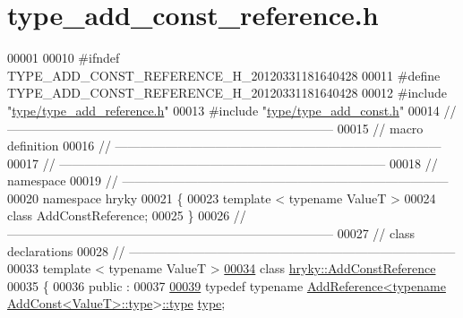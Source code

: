 \hypertarget{type__add__const__reference_8h_source}{\section{type\-\_\-add\-\_\-const\-\_\-reference.\-h}
}

\begin{DoxyCode}
00001 
00010 \textcolor{preprocessor}{#ifndef TYPE\_ADD\_CONST\_REFERENCE\_H\_20120331181640428}
00011 \textcolor{preprocessor}{}\textcolor{preprocessor}{#define TYPE\_ADD\_CONST\_REFERENCE\_H\_20120331181640428}
00012 \textcolor{preprocessor}{}\textcolor{preprocessor}{#include "\hyperlink{type__add__reference_8h}{type/type_add_reference.h}"}
00013 \textcolor{preprocessor}{#include "\hyperlink{type__add__const_8h}{type/type_add_const.h}"}
00014 \textcolor{comment}{//
      ------------------------------------------------------------------------------}
00015 \textcolor{comment}{// macro definition}
00016 \textcolor{comment}{//
      ------------------------------------------------------------------------------}
00017 \textcolor{comment}{//
      ------------------------------------------------------------------------------}
00018 \textcolor{comment}{// namespace}
00019 \textcolor{comment}{//
      ------------------------------------------------------------------------------}
00020 \textcolor{keyword}{namespace }hryky
00021 \{
00023     \textcolor{keyword}{template} < \textcolor{keyword}{typename} ValueT >
00024     \textcolor{keyword}{class }AddConstReference;
00025 \}
00026 \textcolor{comment}{//
      ------------------------------------------------------------------------------}
00027 \textcolor{comment}{// class declarations}
00028 \textcolor{comment}{//
      ------------------------------------------------------------------------------}
00033 \textcolor{comment}{}\textcolor{keyword}{template} < \textcolor{keyword}{typename} ValueT >
\hypertarget{type__add__const__reference_8h_source_l00034}{}\hyperlink{classhryky_1_1_add_const_reference}{00034} \textcolor{keyword}{class }\hyperlink{classhryky_1_1_add_const_reference}{hryky::AddConstReference}
00035 \{
00036 \textcolor{keyword}{public} :
00037 
\hypertarget{type__add__const__reference_8h_source_l00039}{}\hyperlink{classhryky_1_1_add_const_reference_aa26e39e87462673d865c90e6a9798b5a}{00039}     \textcolor{keyword}{typedef} \textcolor{keyword}{typename} \hyperlink{classhryky_1_1_add_reference}{AddReference<typename AddConst<ValueT>::type}>\hyperlink{classhryky_1_1_add_const_reference_aa26e39e87462673d865c90e6a9798b5a}{::type} \hyperlink{classhryky_1_1_add_const_reference_aa26e39e87462673d865c90e6a9798b5a}{type};

\end{DoxyCode}
